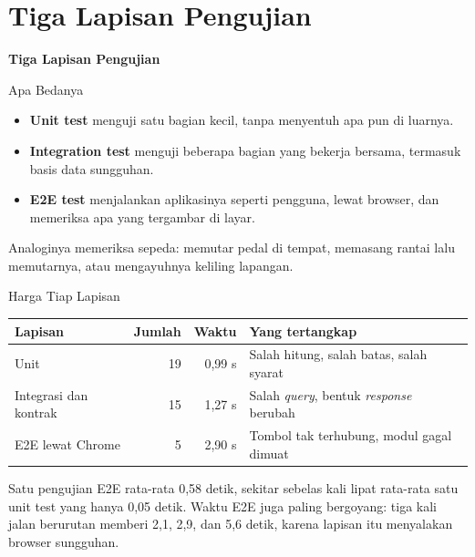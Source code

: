\documentclass[aspectratio=169, table, 12pt]{beamer}
\begin{document}
\section{Tiga Lapisan Pengujian}

\begin{frame}{\hfill}
  \centering
  \Huge{\textbf{Tiga Lapisan Pengujian}}
\end{frame}

\begin{frame}{{\Large Apa Bedanya}}
  \vspace{12pt}
  \begin{itemize}
    \item \textbf{Unit test} menguji satu bagian kecil, tanpa menyentuh apa
          pun di luarnya.
    \item \textbf{Integration test} menguji beberapa bagian yang bekerja
          bersama, termasuk basis data sungguhan.
    \item \textbf{E2E test} menjalankan aplikasinya seperti pengguna, lewat
          browser, dan memeriksa apa yang tergambar di layar.
  \end{itemize}
  \vspace{8pt}
  {\small Analoginya memeriksa sepeda: memutar pedal di tempat, memasang
  rantai lalu memutarnya, atau mengayuhnya keliling lapangan.}
\end{frame}

\begin{frame}{{\Large Harga Tiap Lapisan}}
  \vspace{6pt}
  \centering
  {\footnotesize
  \begin{tabularx}{\textwidth}{lrrY}
    \hline
    \textbf{Lapisan} & \textbf{Jumlah} & \textbf{Waktu} & \textbf{Yang tertangkap} \\
    \hline
    Unit & 19 & 0,99 s & Salah hitung, salah batas, salah syarat \\
    \hline
    Integrasi dan kontrak & 15 & 1,27 s & Salah \textit{query}, bentuk \textit{response} berubah \\
    \hline
    E2E lewat Chrome & 5 & 2,90 s & Tombol tak terhubung, modul gagal dimuat \\
    \hline
  \end{tabularx}}

  \vspace{8pt}
  {\small Satu pengujian E2E rata-rata 0,58 detik, sekitar sebelas kali
  lipat rata-rata satu unit test yang hanya 0,05 detik. Waktu E2E juga paling
  bergoyang: tiga kali jalan berurutan memberi 2,1, 2,9, dan 5,6 detik, karena
  lapisan itu menyalakan browser sungguhan.}
\end{frame}
\end{document}
